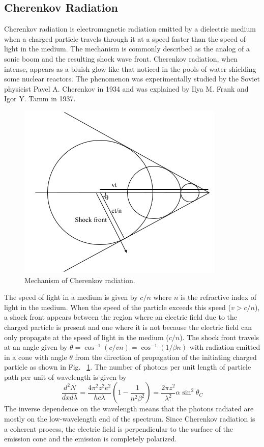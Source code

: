 \documentclass[main.tex]{subfiles}
\begin{document}
\subsection{Cherenkov Radiation}
Cherenkov radiation is electromagnetic radiation emitted by a dielectric medium when a charged particle travels through it at a speed faster than the speed of light in the medium. The mechanism is commonly described as the analog of a sonic boom and the resulting shock wave front. Cherenkov radiation, when intense, appears as a bluish glow like that noticed in the pools of water shielding some nuclear reactors. The phenomenon was experimentally studied by the Soviet physicist Pavel A. Cherenkov in 1934 and was explained by Ilya M. Frank and Igor Y. Tamm in 1937.\par

\begin{figure}[htbp]
  \centering
  \includegraphics[width=0.6\linewidth]{images/Cherenkov}
  \caption[Mechanism of Cherenkov radiation.]{Mechanism of Cherenkov radiation.}
  \label{fig:Cherenkov}
\end{figure}

The speed of light in a medium is given by $c/n$ where $n$ is the refractive index of light in the medium. When the speed of the particle exceeds this speed ($v>c/n$), a shock front appears between the region where an electric field due to the charged particle is present and one where it is not because the electric field can only propagate at the speed of light in the medium ($c/n$). The shock front travels at an angle given by $\theta = \cos^{-1}(c/vn) = \cos^{-1}(1/\beta n)$ with radiation emitted in a cone with angle $\theta$ from the direction of propagation of the initiating charged particle as shown in Fig. ~\ref{fig:Cherenkov}. The number of photons per unit length of particle path per unit of wavelength is given by 
\begin{equation}
  \frac{d^2N}{dxd\lambda} = \frac{4\pi^2z^2e^2}{hc\lambda}\left(1-\frac{1}{n^2\beta^2}\right) = \frac{2\pi z^2}{\lambda^2}\alpha\sin^2\theta_C
\end{equation}
The inverse dependence on the wavelength means that the photons radiated are mostly on the low-wavelength end of the spectrum. Since Cherenkov radiation is a coherent process, the electric field is perpendicular to the surface of the emission cone and the emission is completely polarized.
\end{document}
